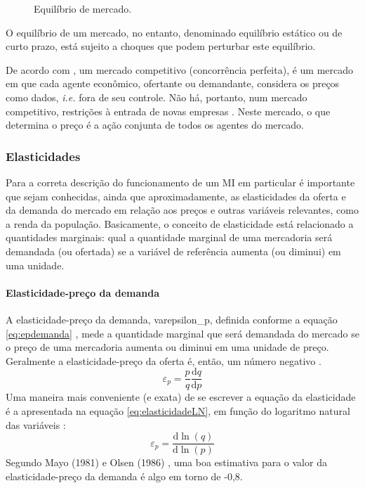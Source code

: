 \documentclass[
	12pt,				%
	oneside,			%
	a4paper,			%
	chapter=TITLE,		%
	section=TITLE,		%
	english,			%
	brazil				%
	]{abntex2}
\begin{document}
\begin{refsection}
\begin{figure}[H]
{}

\caption{Equilíbrio de mercado.}\label{fig:equilibrioMercado}
\end{figure}
O equilíbrio de um mercado, no entanto, denominado equilíbrio estático ou de
curto prazo, está sujeito a choques que podem perturbar este equilíbrio.

De acordo com \textcite[p.~310]{varian}, um mercado competitivo (concorrência perfeita),
é um mercado em que cada agente econômico, ofertante ou demandante, considera os
preços como dados, \emph{i.e.} fora de seu controle. Não há, portanto, num mercado
competitivo, restrições à entrada de novas empresas \autocite[p.~433]{varian}. Neste
mercado, o que determina o preço é a ação conjunta de todos os agentes do
mercado.

\hypertarget{elasticidades}{%
\subsubsection{Elasticidades}\label{elasticidades}}

Para a correta descrição do funcionamento de um \gls{MI} em particular é
importante que sejam conhecidas, ainda que aproximadamente, as elasticidades da
oferta e da demanda do mercado em relação aos preços e outras variáveis
relevantes, como a renda da população. Basicamente, o conceito de elasticidade
está relacionado a quantidades marginais: qual a quantidade marginal de uma
mercadoria será demandada (ou ofertada) se a variável de referência aumenta (ou
diminui) em uma unidade.

\hypertarget{elasticidade-preuxe7o-da-demanda}{%
\paragraph{Elasticidade-preço da demanda}\label{elasticidade-preuxe7o-da-demanda}}

A elasticidade-preço da demanda, \gls{varepsilon_p}, definida conforme a equação
\eqref{eq:epdemanda} \autocite[p.~302]{varian}, mede a quantidade marginal que será
demandada do mercado se o preço de uma mercadoria aumenta ou diminui em uma
unidade de preço. Geralmente a elasticidade-preço da oferta é, então, um número
negativo \autocite[289]{varian}.
\begin{equation}
\varepsilon_p = \frac{p}{q}\frac{\mathrm{d} q}{\mathrm{d} p}
\label{eq:epdemanda}
\end{equation}
Uma maneira mais conveniente (e exata) de se escrever a equação da elasticidade
é a apresentada na equação \eqref{eq:elasticidadeLN}, em função do logaritmo
natural das variáveis \autocite[p.307-308]{varian}:
\begin{equation}
\varepsilon_p = \frac{\mathrm{d} \ln(q)}{\mathrm{d} \ln(p)}
\label{eq:elasticidadeLN}
\end{equation}
Segundo Mayo (1981) e Olsen (1986) \autocite[\emph{apud}][p.23]{Malpezzi2002TheRO}, uma boa
estimativa para o valor da elasticidade-preço da demanda é algo em torno de -0,8.


\end{refsection}
\end{document}
